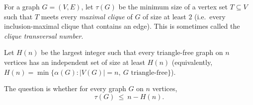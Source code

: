 For a graph $G=(V,E)$, let $\tau(G)$ be the minimum size of a vertex set $T\subseteq V$ such that
$T$ meets every \emph{maximal clique} of $G$ of size at least $2$ (i.e.\ every inclusion-maximal clique
that contains an edge). This is sometimes called the \emph{clique transversal number}.

Let $H(n)$ be the largest integer such that every triangle-free graph on $n$ vertices has an independent set
of size at least $H(n)$ (equivalently, $H(n)=\min\{\alpha(G): |V(G)|=n,\ G\text{ triangle-free}\}$).

The question is whether for every graph $G$ on $n$ vertices,
\[
\tau(G)\ \le\ n-H(n).
\]
